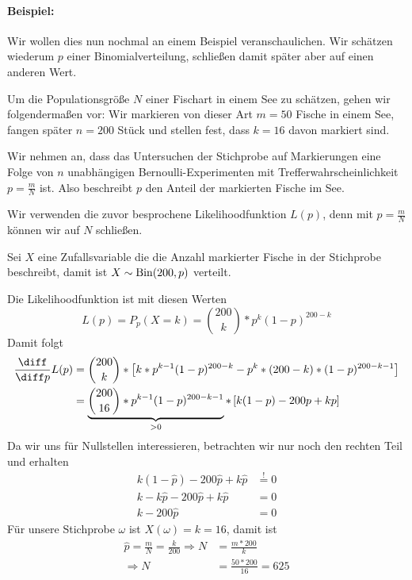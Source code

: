 \paragraph{Beispiel:}
Wir wollen dies nun nochmal an einem Beispiel veranschaulichen. Wir schätzen wiederum $p$ einer Binomialverteilung, schließen damit später aber auf einen anderen Wert.
\begin{eBox}{}{}
	Um die Populationsgröße $N$ einer Fischart in einem See zu schätzen, gehen wir folgendermaßen vor: Wir markieren von dieser Art $m=50$ Fische in einem See, fangen später $n=200$ Stück und stellen fest, dass $k=16$ davon markiert sind.

	Wir nehmen an, dass das Untersuchen der Stichprobe auf Markierungen eine Folge von $n$ unabhängigen Bernoulli-Experimenten mit Trefferwahrscheinlichkeit $p=\frac mN$ ist. Also beschreibt $p$ den Anteil der markierten Fische im See.
\end{eBox}
Wir verwenden die zuvor besprochene Likelihoodfunktion $L(p)$, denn mit $p=\frac mN$ können wir auf $N$ schließen. 

Sei $X$ eine Zufallsvariable die die Anzahl markierter Fische in der Stichprobe beschreibt, damit ist $X \sim \operatorname{Bin}(200,p)$ verteilt. 

Die Likelihoodfunktion ist mit diesen Werten
\begin{equation*}
	L(p)=P_p(X=k)=\binom{200}{k}* p^{k}(1-p)^{200-k}
\end{equation*}
Damit folgt
\begin{align*}
	\frac{\diff}{\diff p}L(p) &= \binom{200}{k}*\left[ k*p^{k-1}(1-p)^{200-k} - p^k*(200-k)*(1-p)^{200-k-1}\right]\\
	&=\underbrace{\binom{200}{16}* p^{k-1}(1-p)^{200-k-1}}_{>0} * \left[ k(1-p)-200p+kp \right]\\
\end{align*}%
Da wir uns für Nullstellen interessieren, betrachten wir nur noch den rechten Teil und erhalten
\begin{align*}
	k(1-\hat p)-200\hat p+k\hat p&\overset != 0\\
	k-k\hat p-200\hat p+k\hat p &= 0\\
	k-200\hat p&=0
\end{align*}
Für unsere Stichprobe $\omega$ ist $X(\omega)=k=16$, damit ist
\begin{align*}
	\hat p =\frac{m}{N} =\frac k{200}\Rightarrow N&=\frac {m*200}{k}\\
	\Rightarrow N &= \frac{50*200}{16} = 625
\end{align*}

